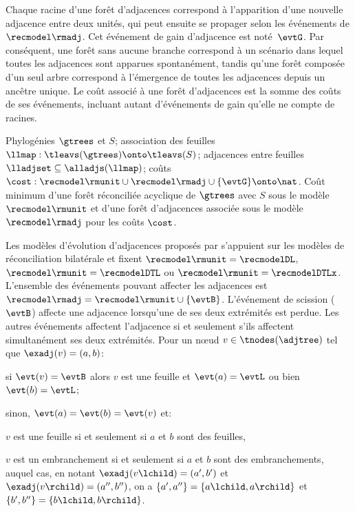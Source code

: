 Chaque racine d’une forêt d’adjacences correspond à l’apparition d’une nouvelle adjacence entre deux unités, qui peut ensuite se propager selon les événements de \(\recmodel\rmadj\).
Cet événement de gain d’adjacence est noté~\(\evtG\).
Par conséquent, une forêt sans aucune branche correspond à un scénario dans lequel toutes les adjacences sont apparues spontanément, tandis qu’une forêt composée d’un seul arbre correspond à l’émergence de toutes les adjacences depuis un ancêtre unique.
Le coût associé à une forêt d’adjacences est la somme des coûts de ses événements, incluant autant d’événements de gain qu’elle ne compte de racines.

    {Phylogénies \(\gtrees\) et \(S\);
     association des feuilles \(\llmap : \tleavs(\gtrees) \onto \tleavs(S)\);
     adjacences entre feuilles \(\lladjset \subseteq \alladjs(\llmap)\);
     coûts \(\cost : \recmodel\rmunit \cup \recmodel\rmadj \cup \{\evtG\} \onto \nat\).}
    {Coût minimum d’une forêt réconciliée acyclique de \(\gtrees\) avec \(S\) sous le modèle \(\recmodel\rmunit\)
     et d’une forêt d’adjacences associée sous le modèle \(\recmodel\rmadj\)
 pour les coûts \(\cost\).}

Les modèles d’évolution d’adjacences proposés par \textcite{Berard2012EvolutionGeneNeighborhoods,Patterson2013LateralGeneTransfer,Duchemin2017DecostarReconstructingAncestral} s’appuient sur les modèles de réconciliation bilatérale et fixent \(\recmodel\rmunit = \recmodelDL\), \(\recmodel\rmunit = \recmodelDTL\) ou \(\recmodel\rmunit = \recmodelDTLx\).
L’ensemble des événements pouvant affecter les adjacences est \(\recmodel\rmadj = \recmodel\rmunit \cup \{\evtB\}\).
L’événement de scission (\(\evtB\)) affecte une adjacence lorsqu’une de ses deux extrémités est perdue.
Les autres événements affectent l’adjacence si et seulement s’ils affectent simultanément ses deux extrémités.
Pour un nœud \(v \in \tnodes(\adjtree)\) tel que \(\exadj(v) = (a, b)\):
\begin{compactitemize}
    \item si \(\evt(v) = \evtB\) alors \(v\) est une feuille et \(\evt(a) = \evtL\) ou bien \(\evt(b) = \evtL\);
    \item sinon, \(\evt(a) = \evt(b) = \evt(v)\) et:
    \begin{compactitemize}
        \item \(v\) est une feuille si et seulement si \(a\) et \(b\) sont des feuilles,
        \item \(v\) est un embranchement si et seulement si \(a\) et \(b\) sont des embranchements, auquel cas, en notant
            \(\exadj(v\lchild) = (a', b')\) et \(\exadj(v\rchild) = (a'', b'')\), on a
            \(\{a', a''\} = \{a\lchild, a\rchild\}\) et \(\{b', b''\} = \{b\lchild, b\rchild\}\).
    \end{compactitemize}
\end{compactitemize}

